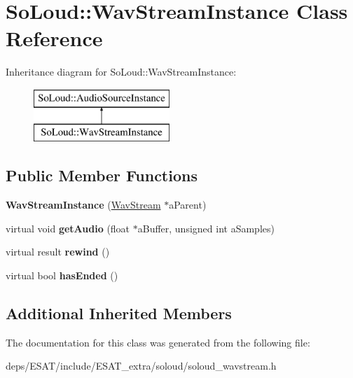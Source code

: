 \hypertarget{class_so_loud_1_1_wav_stream_instance}{}\section{So\+Loud\+:\+:Wav\+Stream\+Instance Class Reference}
\label{class_so_loud_1_1_wav_stream_instance}
Inheritance diagram for So\+Loud\+:\+:Wav\+Stream\+Instance\+:\begin{figure}[H]
\begin{center}
\leavevmode
\includegraphics[height=2.000000cm]{class_so_loud_1_1_wav_stream_instance}
\end{center}
\end{figure}
\subsection*{Public Member Functions}
\begin{DoxyCompactItemize}
\item 
\mbox{\label{class_so_loud_1_1_wav_stream_instance_a2c28700b138633763722906d90a27b87}} 
{\bfseries Wav\+Stream\+Instance} (\mbox{\hyperlink{class_so_loud_1_1_wav_stream}{Wav\+Stream}} $\ast$a\+Parent)
\item 
\mbox{\label{class_so_loud_1_1_wav_stream_instance_a860ab1646c7e9f86474993e7f6e246b6}} 
virtual void {\bfseries get\+Audio} (float $\ast$a\+Buffer, unsigned int a\+Samples)
\item 
\mbox{\label{class_so_loud_1_1_wav_stream_instance_a61573538b0e0b69a3b21fd394d1b7090}} 
virtual result {\bfseries rewind} ()
\item 
\mbox{\label{class_so_loud_1_1_wav_stream_instance_a3bfe7d52821a15b46a537ed17367c900}} 
virtual bool {\bfseries has\+Ended} ()
\end{DoxyCompactItemize}
\subsection*{Additional Inherited Members}


The documentation for this class was generated from the following file\+:\begin{DoxyCompactItemize}
\item 
deps/\+E\+S\+A\+T/include/\+E\+S\+A\+T\+\_\+extra/soloud/soloud\+\_\+wavstream.\+h\end{DoxyCompactItemize}
